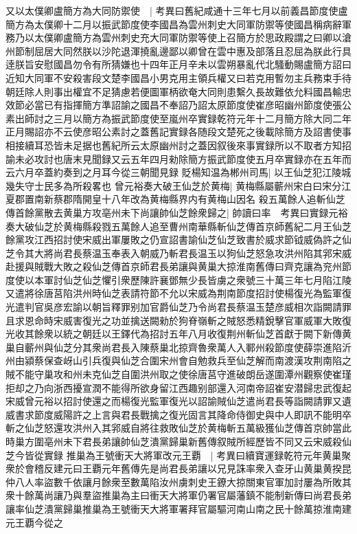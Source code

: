 又以太僕卿盧簡方為大同防禦使　|{
	考異曰舊紀咸通十三年七月以前義昌節度使盧簡方為太僕卿十二月以振武節度使李國昌為雲州刺史大同軍防禦等使國昌稱病辭軍務乃以太僕卿盧簡方為雲州刺史充大同軍防禦等使上召簡方於思政殿謂之曰卿以滄州節制屈居大同然朕以沙陀退渾撓亂邊鄙以卿曾在雲中惠及部落且忍屈為朕此行具逹朕旨安慰國昌勿令有所猜嫌也十四年正月辛未以雲朔暴亂代北騷動賜盧簡方詔曰近知大同軍不安殺害段文楚李國昌小男克用主領兵權又曰若克用暫勿主兵務束手待朝廷除人則事出權宜不足猜慮若便圖軍柄欲奄大同則患繫久長故難依允料國昌輸忠效節必當已有指揮簡方準詔諭之國昌不奉詔乃詔太原節度使崔彦昭幽州節度使張公素出師討之三月以簡方為振武節度使至嵐州卒實録乾符元年十二月簡方除大同二年正月賜詔亦不云使彦昭公素討之蓋舊記實録各随段文楚死之後載除簡方及詔書使事相接續耳恐皆未足据也舊紀所云太原幽州討之蓋因叙後來事實録所以不取者方知招諭未必攻討也唐末見聞録又云五年四月勑除簡方振武節度使五月卒實録亦在五年而云六月卒蓋約奏到之月耳今從三朝聞見録}
貶楊知温為郴州司馬|{
	以王仙芝犯江陵城幾失守士民多為所殺畧也}
曾元裕奏大破王仙芝於黄梅|{
	黄梅縣屬蘄州宋白曰宋分江夏郡置南新蔡郡隋開皇十八年改為黄梅縣界内有黄梅山因名}
殺五萬餘人追斬仙芝傳首餘黨散去黄巢方攻亳州未下尚讓帥仙芝餘衆歸之|{
	帥讀曰率　考異曰實録元裕奏大破仙芝於黄梅縣殺戮五萬餘人追至曹州南華縣斬仙芝傳首京師舊紀二月王仙芝餘黨攻江西招討使宋威出軍屢敗之仍宣詔書諭仙芝仙芝致書於威求節钺威偽許之仙芝令其大將尚君長蔡温玉奉表入朝威乃斬君長温玉以狗仙芝怒急攻洪州陷其郛宋威赴援與賊戰大敗之殺仙芝傳首京師君長弟讓與黄巢大掠淮南舊傳曰齊克讓為兖州節度使以本軍討仙芝仙芝懼引衆歷陳許襄鄧無少長皆虜之衆號三十萬三年七月陷江陵又遣將徐唐莒陷洪州時仙芝表請符節不允以宋威為荆南節度招討使楊復光為監軍復光遣判官吳彦宏諭以朝旨釋罪别加官爵仙芝乃令尚君長蔡温玉楚彦威相次詣闕請罪且求恩命時宋威害復光之功並擒送闕勑於狗脊嶺斬之賊怒悉精銳擊官軍威軍大敗復光收其餘衆以統之朝廷以王鐸代為招討五年八月收復荆州斬仙芝首獻于闕下新傳黄巢自蘄州與仙芝分其衆尚君長入陳蔡巢北掠齊魯衆萬人入鄆州殺節度使薛崇進陷沂州由潁蔡保查岈山引兵復與仙芝合圍宋州會自勉救兵至仙芝解而南渡漢攻荆南陷之賊不能守巢攻和州未克仙芝自圍洪州取之使徐唐莒守進破朗岳遂圍潭州觀察使崔瑾拒却之乃向浙西擾宣潤不能得所欲身留江西趣别部還入河南帝詔崔安潜歸忠武復起宋威曾元裕以招討使還之而楊復光監軍復光以詔諭賊仙芝遣尚君長等詣闕請罪又遺威書求節度威陽許之上言與君長戰擒之復光固言其降命侍御史與中人即訊不能明卒斬之仙芝怒還攻洪州入其郛威自將往救敗仙芝於黄梅斬五萬級獲仙芝傳首京帥當此時巢方圍亳州未下君長弟讓帥仙芝潰黨歸巢新舊傳叙賊所經歷皆不同又云宋威殺仙芝今皆從實録}
推巢為王號衝天大將軍改元王覇　|{
	考異曰續寶運録乾符元年黄巢聚衆於會稽反建元曰王覇元年舊傳先是尚君長弟讓以兄見誅率衆入查牙山黄巢黄揆昆仲八人率盜數千依讓月餘衆至數萬陷汝州虜刺史王鐐大掠關東官軍加討屢為所敗其衆十餘萬尚讓乃與羣盜推巢為主曰衝天大將軍仍署官屬藩鎮不能制新傳曰尚君長弟讓率仙芝潰黨歸巢推巢為王號衝天大將軍署拜官屬驅河南山南之民十餘萬掠淮南建元王覇今從之}
